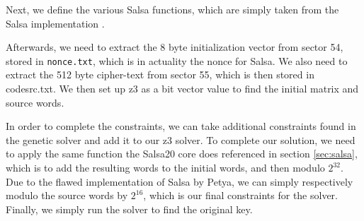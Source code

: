 \documentclass[twocolumn]{article}
\newcommand{\code}[1]{\texttt{#1}}
\begin{document}
Next, we define the various Salsa functions, which are simply taken from the Salsa implementation \cite{salsa20}. 

Afterwards, we need to extract the 8 byte initialization vector from sector 54, stored in \code{nonce.txt}, which is in actuality the nonce for Salsa. We also need to extract the 512 byte cipher-text from sector 55, which is then stored in code{src.txt}. We then set up z3 as a bit vector value to find the initial matrix and source words. 

In order to complete the constraints, we can take additional constraints found in the genetic solver and add it to our z3 solver. To complete our solution, we need to apply the same function the Salsa20 core does referenced in section \ref{sec:salsa}, which is to add the resulting words to the initial words, and then modulo $2^{32}$. Due to the flawed implementation of Salsa by Petya, we can simply respectively modulo the source words by $2^{16}$, which is our final constraints for the solver. Finally, we simply run the solver to find the original key. 

 
\end{document}
